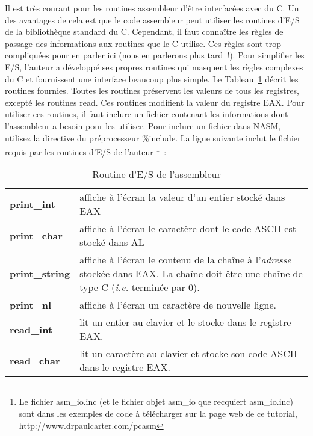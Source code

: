 Il est très courant pour les routines assembleur d'être interfacées avec du C. Un
des avantages de cela est que le code assembleur peut utiliser les routines
d'E/S de la bibliothèque standard du C. Cependant, il faut connaître les règles
de passage des informations aux routines que le C utilise. Ces règles sont trop
compliquées pour en parler ici (nous en parlerons plus tard~!). Pour simplifier
les E/S, l'auteur a développé ses propres routines qui masquent les règles complexes
du C et fournissent une interface beaucoup plus simple. Le Tableau~\ref{tab:asmio}
décrit les routines fournies. Toutes les routines préservent les valeurs de 
tous les registres, excepté les routines read. Ces routines modifient la
valeur du registre EAX. Pour utiliser ces routines, il faut inclure un fichier
contenant les informations dont l'assembleur a besoin pour les utiliser. Pour inclure
un fichier dans NASM, utilisez la directive du préprocesseur {\code \%include}.
La ligne suivante inclut le fichier requis par les routines d'E/S de l'auteur
\footnote{Le fichier {\code asm\_io.inc} (et le fichier objet {\code asm\_io}
que recquiert {\code asm\_io.inc}) sont dans les exemples de code à télécharger sur
la page web de ce tutorial, {\code http://www.drpaulcarter.com/pcasm}}~:
\begin{AsmCodeListing}[frame=none, numbers=none]
\end{AsmCodeListing}

\begin{table}[t]
\centering
\begin{tabular}{lp{3.5in}}
{\bf print\_int} & affiche à l'écran la valeur d'un entier stocké dans EAX\\
{\bf print\_char} & affiche à l'écran le caractère dont le code ASCII est stocké dans AL\\
{\bf print\_string} & affiche à l'écran le contenu de la chaîne à l'{\em adresse} stockée
                      dans EAX. La chaîne doit être une chaîne de type C ({\em i.e.} terminée par 0).\\
{\bf print\_nl} & affiche à l'écran un caractère de nouvelle ligne. \\
{\bf read\_int} & lit un entier au clavier et le stocke dans le registre EAX. \\
{\bf read\_char} & lit un caractère au clavier et stocke son code ASCII dans le registre EAX.\\
\end{tabular}
\caption{Routine d'E/S de l'assembleur\label{tab:asmio} 
  
 
}
\end{table}

